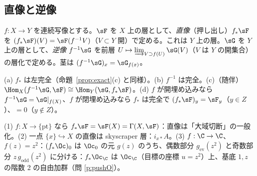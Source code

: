 \subsection{直像と逆像}
\begin{defn}[直像・逆像]
$f:X\to Y$ を連続写像とする。$\sF$ を $X$ 上の層として、\emph{直像}（押し出し）$f_*\sF$ を $(f_*\sF)(V)=\sF(f^{-1}V)$（$V\subset Y$ 開）で定める。これは $Y$ 上の層。$\sG$ を $Y$ 上の層として、\emph{逆像} $f^{-1}\sG$ を前層 $U\mapsto\varinjlim_{V\supset f(U)}\sG(V)$（$V$ は $Y$ の開集合）の層化で定める。茎は $(f^{-1}\sG)_x=\sG_{f(x)}$。
\end{defn}
\begin{prop}[性質]\label{prop:pushprops}\tC
(a) $f_*$ は左完全（命題~\ref{prop:exact}(c) と同様）。(b) $f^{-1}$ は完全。(c)（随伴）$\Hom_X(f^{-1}\sG,\sF)\cong\Hom_Y(\sG,f_*\sF)$。(d) $f$ が開埋め込みなら $f^{-1}\sG=\sG|_{f(X)}$、$f$ が閉埋め込みなら $f_*$ は完全で $(f_*\sF)_y=\sF_y$（$y\in Z$）、$=0$（$y\notin Z$）。
\end{prop}
\begin{ex}\label{ex:pushforwards}
(1) $f:X\to\{\mathrm{pt}\}$ なら $f_*\sF=\sF(X)=\Gamma(X,\sF)$：直像は「大域切断」の一般化。(2) 一点 $\{x\}\hookrightarrow X$ の直像は skyscraper 層：$i_{x*}A$。(3) $f:\C\to\C$、$f(z)=z^2$：$(f_*\Oc)_0$ は $\Oc_0$ の元 $g(z)$ のうち、偶数部分 $g_{\mathrm{ev}}(z^2)$ と奇数部分 $z\,g_{\mathrm{odd}}(z^2)$ に分ける：$f_*\Oc_{\C}$ は $\Oc_{\C}$（目標の座標 $u=z^2$）上、基底 $1,z$ の階数 2 の自由加群（問 \ref{p:pushO}）。
\end{ex}

